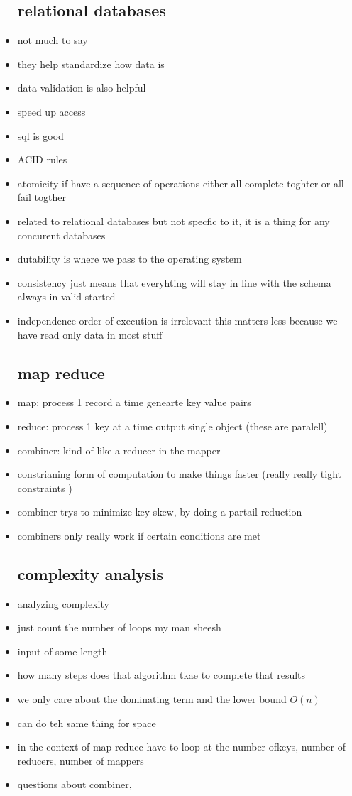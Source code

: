 \documentclass{article}
\begin{document}
\begin{itemize}
\subsection*{relational databases }
    \item not much to say 
    \item they help standardize how data is 
    \item data validation is also helpful
    \item speed up access 
    \item sql is good
    \item ACID rules
    \item atomicity if have a sequence of operations either all complete toghter or all fail togther 
    \item related to relational databases but not specfic to it, it is a thing for any concurent databases 
    \item dutability is where we pass to the operating system 
    \item consistency just means that everyhting will stay in line with the schema always in valid started
    \item independence order of execution is irrelevant this matters less because we have read only data in most stuff
\subsection*{map reduce }
    \item map: process 1 record a time genearte key value pairs
    \item reduce: process 1 key at a time output single object (these are paralell)
    \item combiner: kind of like a reducer in the mapper
    \item constrianing form of computation to make things faster (really really tight constraints )
    \item combiner trys to minimize key skew, by doing a partail reduction 
    \item combiners only really work if certain conditions are met 
\subsection*{complexity analysis}
    \item analyzing complexity 
    \item just count the number of loops my man sheesh 
    \item input of some length 
    \item how many steps does that algorithm tkae to complete that results
    \item we only care about the dominating term and the lower bound $O(n)$
    \item can do teh same thing for space
    \item in the context of map reduce have to loop at the number ofkeys, number of reducers, number of mappers
    \item questions about combiner, 

\end{itemize}
\end{document}
